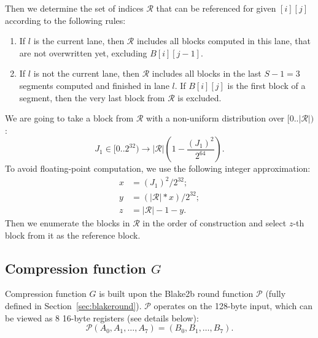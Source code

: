 \documentclass[a4paper]{article}
\begin{document}
 Then we determine the set of indices $\mathcal{R}$ that can be referenced for given $[i][j]$ according to the following rules:
\begin{enumerate}
    \item If $l$ is the current lane, then $\mathcal{R}$ includes all blocks computed in this lane, that are not overwritten yet, excluding $B[i][j-1]$.
    \item If $l$ is not the current lane, then $\mathcal{R}$ includes all blocks in the last $S-1=3$ segments computed and finished in lane $l$. If $B[i][j]$ is the first block of a segment, then the very last block from $\mathcal{R}$ is excluded.
\end{enumerate}
  We are going to take a block from $\mathcal{R}$ with a non-uniform distribution over $[0..|\mathcal{R}|)$:
  $$
  J_1\in [0..2^{32}) \rightarrow |\mathcal{R}|\left(1-\frac{(J_1)^2}{2^{64}}\right).
  $$ To avoid floating-point computation, we use the following integer approximation:
\begin{align*}
x &= (J_1)^2/2^{32};\\
y &= (|\mathcal{R}|*x)/2^{32};\\
z & = |\mathcal{R}|-1-y.
\end{align*}
Then we enumerate the blocks in $\mathcal{R}$ in the order of construction and select $z$-th block from it as the reference block.



\subsection{Compression function \texorpdfstring{$G$}{G}}\label{sec:compr}

Compression function $G$ is built upon  the Blake2b round function $\mathcal{P}$ (fully defined in Section~\ref{sec:blakeround}). $\mathcal{P}$ operates on the 128-byte input, which can be viewed as 8 16-byte registers (see details below):
$$
\mathcal{P}(A_0,A_1,\ldots, A_7) = (B_0,B_1,\ldots, B_7).
$$
\end{document}
